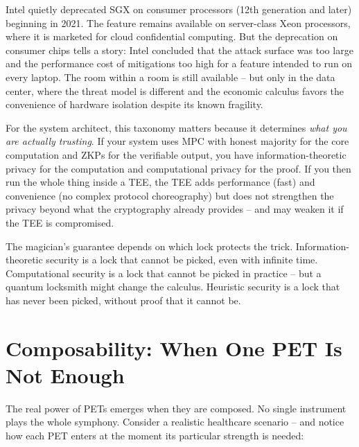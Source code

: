 \documentclass[
  11pt,
  openany]{report}
\begin{document}
Intel quietly deprecated SGX on consumer processors (12th generation and later)
beginning in 2021. The feature remains available on server-class Xeon
processors, where it is marketed for cloud confidential computing. But the
deprecation on consumer chips tells a story: Intel concluded that the attack
surface was too large and the performance cost of mitigations too high for a
feature intended to run on every laptop. The room within a room is still
available -- but only in the data center, where the threat model is different
and the economic calculus favors the convenience of hardware isolation despite
its known fragility.

For the system architect, this taxonomy matters because it determines \emph{what
you are actually trusting}. If your system uses MPC with honest majority for the
core computation and ZKPs for the verifiable output, you have
information-theoretic privacy for the computation and computational privacy for
the proof. If you then run the whole thing inside a TEE, the TEE adds
performance (fast) and convenience (no complex protocol choreography) but does
not strengthen the privacy beyond what the cryptography already provides -- and
may weaken it if the TEE is compromised.

The magician's guarantee depends on which lock protects the trick.
Information-theoretic security is a lock that cannot be picked, even with
infinite time. Computational security is a lock that cannot be picked in
practice -- but a quantum locksmith might change the calculus. Heuristic
security is a lock that has never been picked, without proof that it cannot be.

\section{Composability: When One PET Is Not
Enough}\label{composability-when-one-pet-is-not-enough}

The real power of PETs emerges when they are composed. No single instrument
plays the whole symphony. Consider a realistic healthcare scenario -- and notice
how each PET enters at the moment its particular strength is needed:
\end{document}
